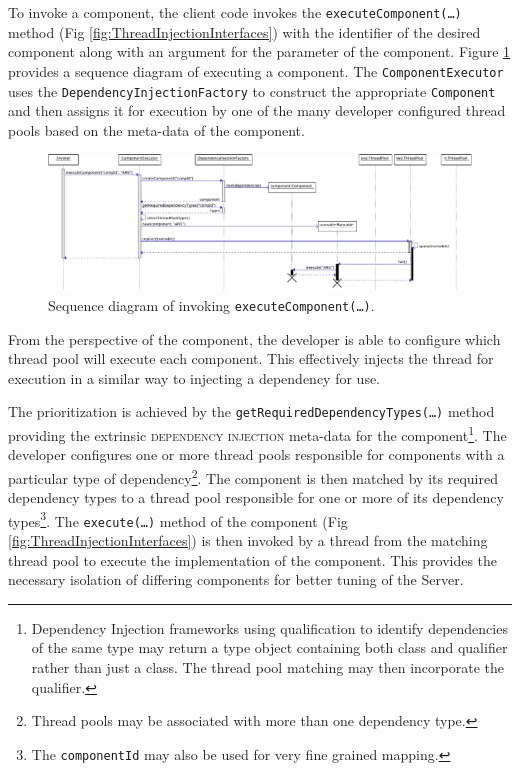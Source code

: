 \documentclass[prodmode]{style/acmlarge}
\begin{document}
To invoke a component, the client code invokes the
\texttt{executeComponent(\ldots)} method (Fig
\ref{fig:ThreadInjectionInterfaces}) with the identifier of the desired
component along with an argument for the parameter of the component.
Figure \ref{fig:ExecuteComponentSequenceDiagram} provides a sequence diagram of
executing a component.  The \texttt{ComponentExecutor} uses the
\texttt{DependencyInjectionFactory} to construct the appropriate
\texttt{Component} and then assigns it for execution by one of the many
developer configured thread pools based on the meta-data of the component.

\begin{figure}[!t]
\centering
\includegraphics[width=6in]{ExecuteComponentSequenceDiagram}
\caption{Sequence diagram of invoking \texttt{executeComponent(\ldots)}.}
\label{fig:ExecuteComponentSequenceDiagram}
\end{figure}

From the perspective of the component, the developer is able to configure which
thread pool will execute each component.  This effectively injects the thread
for execution in a similar way to injecting a dependency for use.

The prioritization is achieved by the
\texttt{getRequiredDependencyTypes(\ldots)} method providing the extrinsic
\textsc{dependency injection} \cite{ioc} meta-data for the
component\footnote{Dependency Injection frameworks using qualification to
identify dependencies of the same type may return a type object containing both
class and qualifier rather than just a class.  The thread pool matching may then
incorporate the qualifier.}.  The developer configures one or more thread pools
responsible for components with a particular type of dependency\footnote{Thread
pools may be associated with more than one dependency type.}.  The component is
then matched by its required dependency types to a thread pool responsible for
one or more of its dependency types\footnote{The \texttt{componentId} may also
be used for very fine grained mapping.}.  The \texttt{execute(\ldots)} method of
the component (Fig \ref{fig:ThreadInjectionInterfaces}) is then invoked by a thread
from the matching thread pool to execute the implementation of the component.
This provides the necessary isolation of differing components for better tuning
of the Server.
\end{document}
